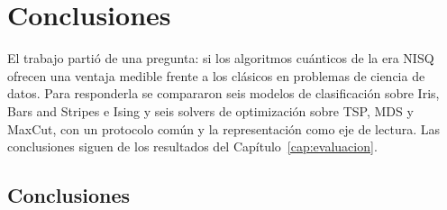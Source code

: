 \chapter{Conclusiones}\label{cap:conclusiones}

El trabajo partió de una pregunta: si los algoritmos cuánticos de la era NISQ ofrecen una ventaja medible frente a los clásicos en problemas de ciencia de datos. Para responderla se compararon seis modelos de clasificación sobre Iris, Bars and Stripes e Ising y seis solvers de optimización sobre TSP, MDS y MaxCut, con un protocolo común y la representación como eje de lectura. Las conclusiones siguen de los resultados del Capítulo~\ref{cap:evaluacion}.

\section{Conclusiones}

